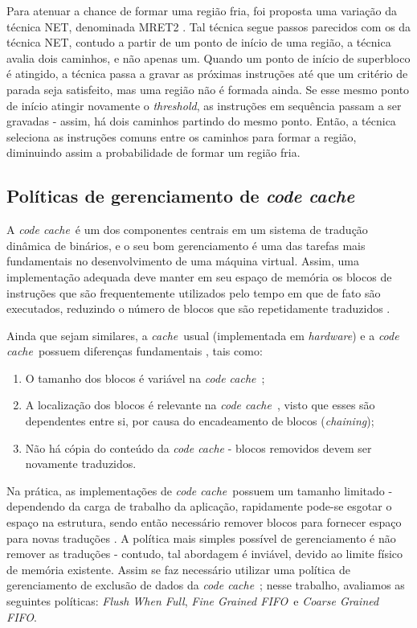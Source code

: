 \documentclass[11pt,twoside]{article}
\newcommand{\ccache}{\emph{code cache}}
\newcommand{\cache}{\emph{cache}}
\newcommand{\flush}{\emph{Flush When Full}}
\newcommand{\finefifo}{\emph{Fine Grained FIFO}}
\newcommand{\coarsefifo}{\emph{Coarse Grained FIFO}}
\begin{document}
Para atenuar a chance de formar uma região fria, foi proposta uma variação da técnica NET, denominada MRET2 \cite{mret2-region}. Tal técnica segue passos parecidos com os da técnica NET, contudo a partir de um ponto de início de uma região, a técnica avalia dois caminhos, e não apenas um. Quando um ponto de início de superbloco é atingido, a técnica passa a gravar as próximas instruções até que um critério de parada seja satisfeito, mas uma região não é formada ainda. Se esse mesmo ponto de início atingir novamente o \emph{threshold}, as instruções em sequência passam a ser gravadas - assim, há dois caminhos partindo do mesmo ponto. Então, a técnica seleciona as instruções comuns entre os caminhos para formar a região, diminuindo assim a probabilidade de formar um região fria.


\subsection{Políticas de gerenciamento de \emph{code cache}}
\label{sec-codecache}
A \ccache~é um dos componentes centrais em um sistema de tradução dinâmica de binários, e o seu bom gerenciamento é uma das tarefas mais fundamentais no desenvolvimento de uma máquina virtual. Assim, uma implementação adequada deve manter em seu espaço de memória os blocos de instruções que são frequentemente utilizados pelo tempo em que de fato são executados, reduzindo o número de blocos que são repetidamente traduzidos \cite{kim-2004-a}.

Ainda que sejam similares, a \cache~usual (implementada em \emph{hardware}) e a \ccache~possuem diferenças fundamentais \cite{smith-vm-book}, tais como:

\begin{enumerate}
\item O tamanho dos blocos é variável na \ccache~;

\item A localização dos blocos é relevante na \ccache~, visto que esses são dependentes entre si, por causa do encadeamento de blocos (\emph{chaining});

\item Não há cópia do conteúdo da \emph{code cache }- blocos removidos devem ser novamente traduzidos.
\end{enumerate}

Na prática, as implementações de \ccache~possuem um tamanho limitado - dependendo da carga de trabalho da aplicação, rapidamente pode-se esgotar o espaço na estrutura, sendo então necessário remover blocos para fornecer espaço para novas traduções \cite{kim-2004}. A política mais simples possível de gerenciamento é não remover as traduções - contudo, tal abordagem é inviável, devido ao limite físico de memória existente. Assim se faz necessário utilizar uma política de gerenciamento de exclusão de dados da \ccache~; nesse trabalho, avaliamos as seguintes políticas: \flush, \finefifo~e \coarsefifo.
\end{document}
